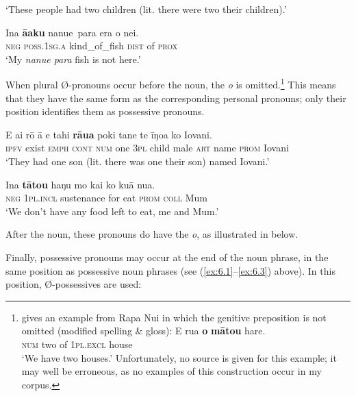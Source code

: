\glt 
‘These people had two children (lit. there were two their children).’ \textstyleExampleref{[R481.005]} 
\z

\ea\label{ex:6.9}
\gll {\ꞌ}Ina \textbf{{\ꞌ}ā{\ꞌ}aku} nanue~para era o nei. \\
\textsc{neg} \textsc{poss.1sg.a} kind\_of\_fish \textsc{dist} of \textsc{prox} \\

\glt
‘My \textit{nanue para} fish is not here.’ \textstyleExampleref{[R301.272]} 
\z

When plural Ø-pronouns occur before the noun, the \textit{o} is omitted.\footnote{\label{fn:286}\citet[106]{Wilson1985} gives an example from Rapa Nui in which the genitive preposition is not omitted (modified spelling \& gloss):
\ea
\gll 
E rua \textbf{o} \textbf{mātou} hare.\\
 \textsc{num} two of \textsc{1pl.excl} house\\
\glt   ‘We have two houses.’ \z
Unfortunately, no source is given for this example; it may well be erroneous, as no examples of this construction occur in my corpus.} This means that they have the same form as the corresponding personal pronouns; only their position identifies them as possessive pronouns.

\ea\label{ex:6.10}
\gll E ai rō {\ꞌ}ā e tahi \textbf{rāua} poki tane te {\ꞌ}īŋoa ko Iovani. \\
\textsc{ipfv} exist \textsc{emph} \textsc{cont} \textsc{num} one \textsc{3pl} child male \textsc{art} name \textsc{prom} Iovani \\

\glt 
‘They had one son (lit. there was one their son) named Iovani.’ \textstyleExampleref{[R238.002]} 
\z

\ea\label{ex:6.11}
\gll {\ꞌ}Ina \textbf{tātou} haŋu mo kai ko kuā nua. \\
\textsc{neg} \textsc{1pl.incl} sustenance for eat \textsc{prom} \textsc{coll} Mum \\

\glt
‘We don’t have any food left to eat, me and Mum.’ \textstyleExampleref{[R372.047]} 
\z

After the noun, these pronouns do have the \textit{o}, as illustrated in  below.

Finally, possessive pronouns may occur at the end of the noun phrase, in the same position as possessive noun phrases (see (\ref{ex:6.1}–\ref{ex:6.3}) above). In this position, Ø-possessives are used:

